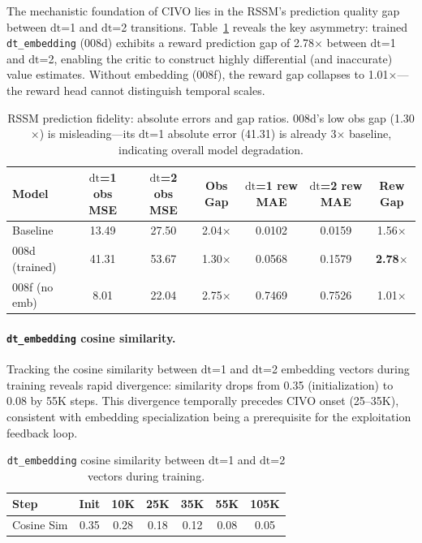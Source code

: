 \documentclass{article}
\newcommand{\dt}{\mathrm{dt}}
\begin{document}
The mechanistic foundation of CIVO lies in the RSSM's prediction quality gap between $\dt$=1 and $\dt$=2 transitions.
Table~\ref{tab:rssm-fidelity} reveals the key asymmetry: trained \texttt{dt\_embedding} (008d) exhibits a reward prediction gap of 2.78$\times$ between $\dt$=1 and $\dt$=2, enabling the critic to construct highly differential (and inaccurate) value estimates.
Without embedding (008f), the reward gap collapses to 1.01$\times$---the reward head cannot distinguish temporal scales.

\begin{table}[h]
\centering
\caption{RSSM prediction fidelity: absolute errors and gap ratios.
008d's low obs gap (1.30$\times$) is misleading---its $\dt$=1 absolute error (41.31) is already 3$\times$ baseline, indicating overall model degradation.}
\label{tab:rssm-fidelity}
\begin{tabular}{lcccccc}
\toprule
\textbf{Model} & \textbf{$\dt$=1 obs MSE} & \textbf{$\dt$=2 obs MSE} & \textbf{Obs Gap} & \textbf{$\dt$=1 rew MAE} & \textbf{$\dt$=2 rew MAE} & \textbf{Rew Gap} \\
\midrule
Baseline & 13.49 & 27.50 & 2.04$\times$ & 0.0102 & 0.0159 & 1.56$\times$ \\
008d (trained) & 41.31 & 53.67 & 1.30$\times$ & 0.0568 & 0.1579 & \textbf{2.78$\times$} \\
008f (no emb) & 8.01 & 22.04 & 2.75$\times$ & 0.7469 & 0.7526 & 1.01$\times$ \\
\bottomrule
\end{tabular}
\end{table}

\paragraph{\texttt{dt\_embedding} cosine similarity.}
Tracking the cosine similarity between $\dt$=1 and $\dt$=2 embedding vectors during training reveals rapid divergence: similarity drops from 0.35 (initialization) to 0.08 by 55K steps.
This divergence temporally precedes CIVO onset (25--35K), consistent with embedding specialization being a prerequisite for the exploitation feedback loop.

\begin{table}[h]
\centering
\caption{\texttt{dt\_embedding} cosine similarity between $\dt$=1 and $\dt$=2 vectors during training.}
\label{tab:cosine}
\begin{tabular}{lcccccc}
\toprule
\textbf{Step} & Init & 10K & 25K & 35K & 55K & 105K \\
\midrule
Cosine Sim & 0.35 & 0.28 & 0.18 & 0.12 & 0.08 & 0.05 \\
\bottomrule
\end{tabular}
\end{table}
\end{document}
